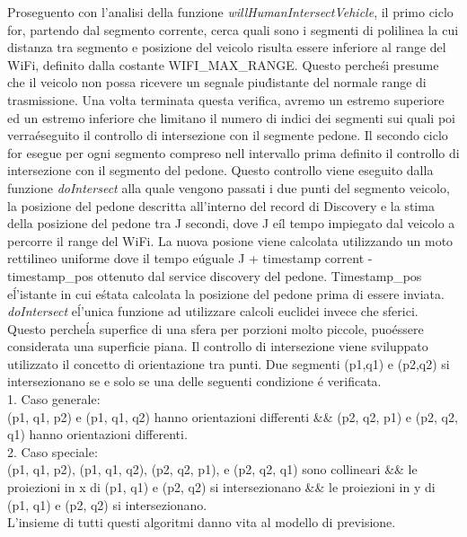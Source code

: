 \documentclass[conference]{IEEEtran}
\begin{document}
Proseguento con l'analisi della funzione \textit{willHumanIntersectVehicle}, il primo ciclo for, partendo dal segmento corrente, cerca quali sono i segmenti di polilinea la cui distanza tra segmento e posizione del veicolo risulta essere inferiore al range del WiFi, definito dalla costante WIFI\_MAX\_RANGE. Questo perche\' si presume che il veicolo non possa ricevere un segnale piu\' distante del normale range di trasmissione.
Una volta terminata questa verifica, avremo un estremo superiore ed un estremo inferiore che limitano il numero di indici dei segmenti sui quali poi verra\' eseguito il controllo di intersezione con il segmente pedone.
Il secondo ciclo for esegue per ogni segmento compreso nell intervallo prima definito il controllo di intersezione con il segmento del pedone.
Questo controllo viene eseguito dalla funzione \textit{doIntersect} alla quale vengono passati i due punti del segmento veicolo, la posizione del pedone descritta all'interno del record di Discovery e la stima della posizione del pedone tra J secondi, dove J e\' il tempo impiegato dal veicolo a percorre il range del WiFi.
La nuova posione viene calcolata utilizzando un moto rettilineo uniforme dove il tempo e\' uguale J + timestamp corrent - timestamp\_pos ottenuto dal service discovery del pedone. Timestamp\_pos e\' l'istante in cui e\' stata calcolata la posizione del pedone prima di essere inviata. 
\textit{doIntersect} e\' l'unica funzione ad utilizzare calcoli euclidei invece che sferici. Questo perche\' la superfice di una sfera per porzioni molto piccole, puo\' essere considerata una superficie piana.
Il controllo di intersezione viene sviluppato utilizzato il concetto di orientazione tra punti.
Due segmenti (p1,q1) e (p2,q2) si intersezionano se e solo se una delle seguenti condizione \'e verificata.
\\
1. Caso generale:\\
(p1, q1, p2) e (p1, q1, q2) hanno orientazioni differenti 
\&\& (p2, q2, p1) e (p2, q2, q1) hanno orientazioni differenti.
\\
2. Caso speciale:\\
(p1, q1, p2), (p1, q1, q2), (p2, q2, p1), e (p2, q2, q1) sono collineari \&\& le proiezioni in x di (p1, q1) e (p2, q2) si intersezionano \&\& le proiezioni in y di (p1, q1) e (p2, q2) si intersezionano.
\\
L'insieme di tutti questi algoritmi danno vita al modello di previsione.
 
\end{document}
